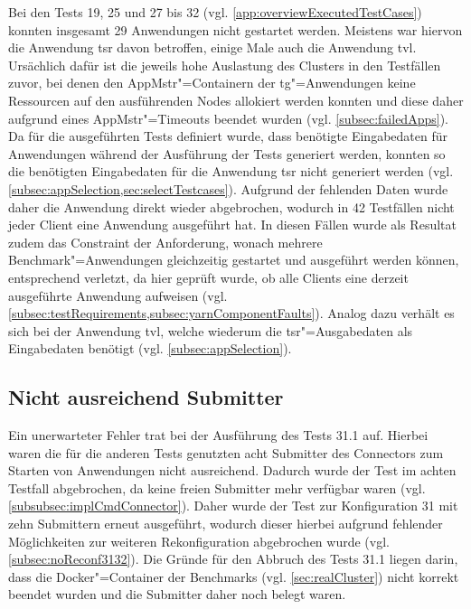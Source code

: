 Bei den Tests 19, 25 und 27 bis 32  (vgl. \cref{app:overviewExecutedTestCases}) konnten insgesamt 29 Anwendungen nicht gestartet werden.
Meistens war hiervon die Anwendung \acrlong{tsr} davon betroffen, einige Male auch die Anwendung \acrlong{tvl}.
Ursächlich dafür ist die jeweils hohe Auslastung des Clusters in den Testfällen zuvor, bei denen den \gls{AppMstr}"=Containern der \acrlong{tg}"=Anwendungen keine Ressourcen auf den ausführenden Nodes allokiert werden konnten und diese daher aufgrund eines \gls{AppMstr}"=Timeouts beendet wurden (vgl. \cref{subsec:failedApps}).
Da für die ausgeführten Tests definiert wurde, dass benötigte Eingabedaten für Anwendungen während der Ausführung der Tests generiert werden, konnten so die benötigten Eingabedaten für die Anwendung \acrlong{tsr} nicht generiert werden (vgl. \cref{subsec:appSelection,sec:selectTestcases}).
Aufgrund der fehlenden Daten wurde daher die Anwendung direkt wieder abgebrochen, wodurch in 42 Testfällen nicht jeder Client eine Anwendung ausgeführt hat.
In diesen Fällen wurde als Resultat zudem das Constraint der Anforderung, wonach mehrere Benchmark"=Anwendungen gleichzeitig gestartet und ausgeführt werden können, entsprechend verletzt, da hier geprüft wurde, ob alle Clients eine derzeit ausgeführte Anwendung aufweisen (vgl. \cref{subsec:testRequirements,subsec:yarnComponentFaults}).
Analog dazu verhält es sich bei der Anwendung \acrlong{tvl}, welche wiederum die \acrlong{tsr}"=Ausgabedaten als Eingabedaten benötigt (vgl. \cref{subsec:appSelection}).

\subsection{Nicht ausreichend Submitter}
\label{subsec:notEnoughSubmitter}

Ein unerwarteter Fehler trat bei der Ausführung des Tests 31.1 auf.
Hierbei waren die für die anderen Tests genutzten acht Submitter des Connectors zum Starten von Anwendungen nicht ausreichend.
Dadurch wurde der Test im achten Testfall abgebrochen, da keine freien Submitter mehr verfügbar waren (vgl. \cref{subsubsec:implCmdConnector}).
Daher wurde der Test zur Konfiguration 31 mit zehn Submittern erneut ausgeführt, wodurch dieser hierbei aufgrund fehlender Möglichkeiten zur weiteren Rekonfiguration abgebrochen wurde (vgl. \cref{subsec:noReconf3132}).
Die Gründe für den Abbruch des Tests 31.1 liegen darin, dass die Docker"=Container der Benchmarks (vgl. \cref{sec:realCluster}) nicht korrekt beendet wurden und die Submitter daher noch belegt waren.
